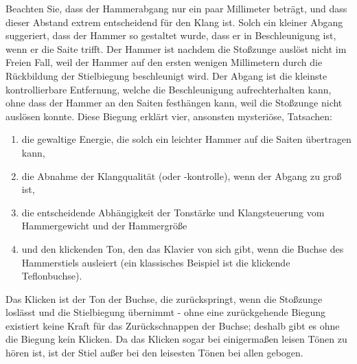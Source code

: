 Beachten Sie, dass der Hammerabgang nur ein paar Millimeter beträgt, und dass dieser Abstand extrem entscheidend für den Klang ist.
Solch ein kleiner Abgang suggeriert, dass der Hammer so gestaltet wurde, dass er in Beschleunigung ist, wenn er die Saite trifft.
Der Hammer ist nachdem die Stoßzunge auslöst nicht im Freien Fall, weil der Hammer auf den ersten wenigen Millimetern durch die Rückbildung der Stielbiegung beschleunigt wird.
Der Abgang ist die kleinste kontrollierbare Entfernung, welche die Beschleunigung aufrechterhalten kann, ohne dass der Hammer an den Saiten festhängen kann, weil die Stoßzunge nicht auslösen konnte.
Diese Biegung erklärt vier, ansonsten mysteriöse, Tatsachen:

\begin{enumerate}[label={\roman*.}] 
 \item die gewaltige Energie, die solch ein leichter Hammer auf die Saiten übertragen kann,
 \item die Abnahme der Klangqualität (oder -kontrolle), wenn der Abgang zu groß ist,
 \item die entscheidende Abhängigkeit der Tonstärke und Klangsteuerung vom Hammergewicht und der Hammergröße
 \item und den klickenden Ton, den das Klavier von sich gibt, wenn die Buchse des Hammerstiels ausleiert (ein klassisches Beispiel ist die klickende Teflonbuchse).
\end{enumerate}

Das Klicken ist der Ton der Buchse, die zurückspringt, wenn die Stoßzunge loslässt und die Stielbiegung übernimmt - ohne eine zurückgehende Biegung existiert keine Kraft für das Zurückschnappen der Buchse; deshalb gibt es ohne die Biegung kein Klicken.
Da das Klicken sogar bei einigermaßen leisen Tönen zu hören ist, ist der Stiel außer bei den leisesten Tönen bei allen gebogen.

